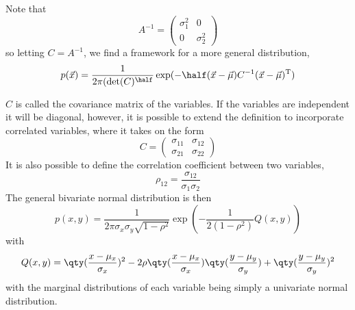 \documentclass{dwnotes}         		        %
\begin{document}
Note that 
\[ A^{-1} =
\begin{pmatrix}
  \sigma_1^2 & 0 \\ 0 & \sigma_2^2
\end{pmatrix} \]
so letting $C = A^{-1}$, we find a framework for a more general distribution,
\[ p(\vec{x}) = \frac{1}{2 \pi ({\rm det}(C)^{\half}} \exp( - \half ( \vec{x} - \vec{\mu})C^{-1} (\vec{x} - \vec{\mu})^{\rm T}) \]

$C$ is called the covariance matrix of the variables. If the variables
are independent it will be diagonal, however, it is possible to extend
the definition to incorporate correlated variables, where it takes on the form
\[ C =
\begin{pmatrix}
  \sigma_{11} & \sigma_{12} \\ \sigma_{21} & \sigma_{22}
\end{pmatrix}
\]
It is also possible to define the correlation coefficient between two variables, 
\begin{equation}
  \label{eq:corrco}
  \rho_{12} = \frac{\sigma_{12}}{\sigma_1 \sigma_2}
\end{equation}
The general bivariate normal distribution is then
\begin{equation}
  \label{eq:genbivariatenormal}
  p(x,y) = \frac{1}{2 \pi \sigma_x \sigma_y \sqrt{1-\rho^2}} \exp( - \frac{1}{2(1-\rho^2)} Q(x,y) )
\end{equation}
with
\[ Q(x,y) = \qty( \frac{x - \mu_x}{\sigma_x} )^2 - 2 \rho \qty(
\frac{x-\mu_x}{\sigma_x}) \qty( \frac{y - \mu_y}{\sigma_y}) + \qty(
\frac{y - \mu_y}{\sigma_y})^2 \] with the marginal distributions of
each variable being simply a univariate normal distribution.
\end{document}
